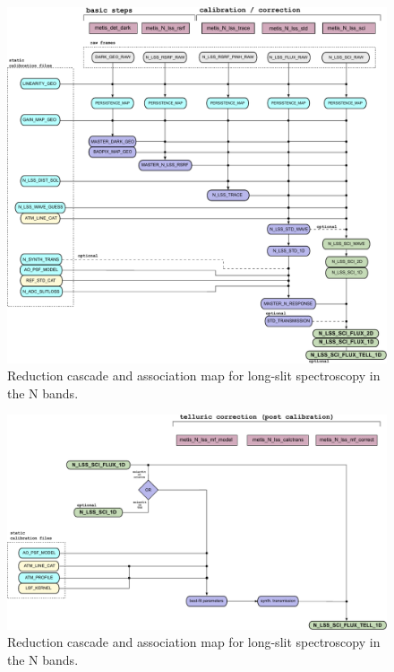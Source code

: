 \begin{landscape}
\begin{figure}[ht]
  \centering
  \includegraphics{figures/N_LSS_pipeline_wf_draft_latest_part_1_v0.83.pdf}
  \caption[Reduction cascade and association map for N long-slit
  spectroscopy]{Reduction cascade and association map for long-slit
    spectroscopy in the N bands. }
  \label{Fig:NLssAssomap1}
    \end{figure}
\end{landscape}

\begin{landscape}
\begin{figure}[ht]
  \centering
  \includegraphics{figures/N_LSS_pipeline_wf_draft_latest_part_2_v0.83.pdf}
  \caption[Reduction cascade and association map for N long-slit
  spectroscopy]{Reduction cascade and association map for long-slit
    spectroscopy in the N bands. }
  \label{Fig:NLssAssomap2}
\end{figure}
\end{landscape}

